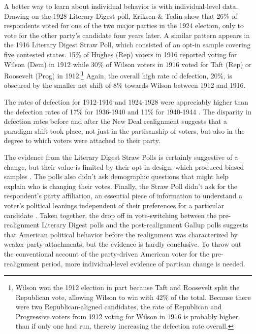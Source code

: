 \documentclass[11pt]{scrartcl}\usepackage[]{graphicx}\usepackage[]{color}
\begin{document}
A better way to learn about individual behavior is with individual-level data.  Drawing on the 1928 Literary Digest poll, Eriksen \& Tedin \citeyearpar{erikson1981partisan} show that 26\% of respondents voted for one of the two major parties in the 1924 election, only to vote for the other party's candidate four years later. A similar pattern appears in the 1916 Literary Digest Straw Poll, which consisted of an opt-in sample covering five contested states. 15\% of Hughes (Rep) voters in 1916 reported voting for Wilson (Dem) in 1912 while 30\% of Wilson voters in 1916 voted for Taft (Rep) or Roosevelt (Prog) in 1912.\footnote{Wilson won the 1912 election in part because Taft and Roosevelt split the Republican vote, allowing Wilson to win with 42\% of the total. Because there were two Republican-aligned candidates, the rate of Republican and Progressive voters from 1912 voting for Wilson in 1916 is probably higher than if only one had run, thereby increasing the defection rate overall.} Again, the overall high rate of defection, 20\%, is obscured by the smaller net shift of 8\% towards Wilson between 1912 and 1916.  

The rates of defection for 1912-1916 and 1924-1928 were appreciably higher than the defection rates of 17\% for 1936-1940 and 11\% for 1940-1944 \citep{erikson1981partisan,key1966responsible}. The disparity in defection rates before and after the New Deal realignment suggests that a paradigm shift took place, not just in the partisanship of voters, but also in the degree to which voters were attached to their party.

The evidence from the Literary Digest Straw Polls is certainly suggestive of a change, but their value is limited by their opt-in design, which produced biased samples \citep{squire19881936}. The polls also didn't ask demographic questions that might help explain who is changing their votes. Finally, the Straw Poll didn't ask for the respondent's party affiliation, an essential piece of information to understand a voter's political leanings independent of their preferences for a particular candidate \citep{campbell1960american}. Taken together, the drop off in vote-switching between the pre-realignment Literary Digest polls and the post-realignment Gallup polls suggests that American political behavior before the realignment was characterized by weaker party attachments, but the evidence is hardly conclusive. To throw out the conventional account of the party-driven American voter for the pre-realignment period, more individual-level evidence of partisan change is needed. 
\end{document}
